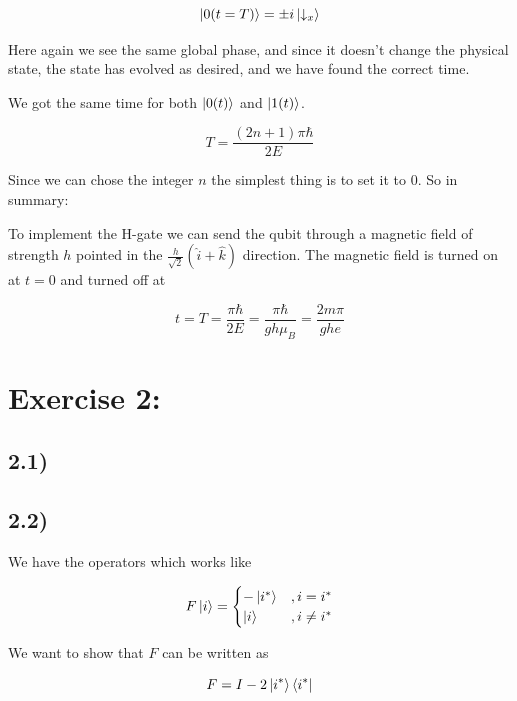 \documentclass[a4paper,norsk, 10pt]{article}
\begin{document}
\begin{equation}
\ket{0(t=T)} = \pm i \ket{\downarrow_x}
\end{equation}\label{eq:downEvolved}

Here again we see the same global phase, and since it doesn't change the physical state, the state has evolved as desired, and we have found the correct time.

We got the same time for both $\ket{0(t)}$ and $\ket{1(t)}$.

\begin{equation}
T = \frac{(2n + 1)\pi\hbar}{2E}
\end{equation}

Since we can chose the integer $n$ the simplest thing is to set it to $0$. So in summary:


To implement the H-gate we can send the qubit through a magnetic field of strength $h$ pointed in the $\frac{h}{\sqrt{2}}(\hat{i} + \hat{k})$ direction. The magnetic field is turned on at $t = 0$ and turned off at 

\begin{equation}
t  = T = \frac{\pi\hbar}{2E} = \frac{\pi \hbar}{g h \mu_B} = \frac{2m \pi}{g h e}
\end{equation}

\section{Exercise 2:}

\subsection{2.1)}\label{sec:21}


\subsection{2.2)}

We have the operators which works like

\begin{equation}
F\ket{i} = 
\begin{cases}
-\ket{i^*} & , i = i^* \\
\ket{i} & , i \neq i^*
\end{cases}
\end{equation}\label{eq:Feffect}

We want to show that $F$ can be written as

\begin{equation}
F = I - 2\ket{i^*}\bra{i^*}
\end{equation}\label{eq:Foperator}
\end{document}
